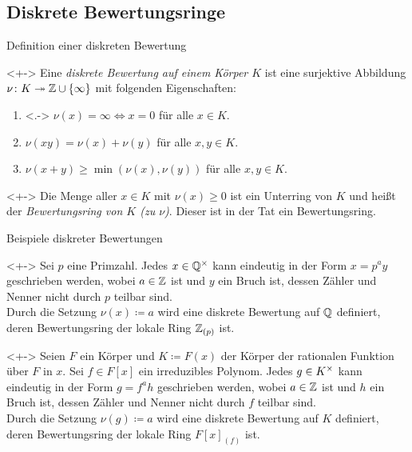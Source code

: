 \subsection{Diskrete Bewertungsringe}

\begin{frame}{Definition einer diskreten Bewertung}
	\begin{definition}<+->
		Eine \emph{diskrete Bewertung auf einem Körper \(K\)} ist eine surjektive Abbildung
		\(\nu\colon K \twoheadrightarrow \mathbb Z \cup \{\infty\}\) mit folgenden Eigenschaften:
		\begin{enumerate}[<+->]
		\item<.->
			\(\nu(x) = \infty \iff x = 0\) für alle \(x \in K\).
		\item
			\(\nu(xy) = \nu(x) + \nu(y)\) für alle \(x, y \in K\).
		\item
			\(\nu(x + y) \ge \min(\nu(x), \nu(y))\) für alle \(x, y \in K\).
		\end{enumerate}
	\end{definition}
	\begin{visibleenv}<+->
		Die Menge aller \(x \in K\) mit \(\nu(x) \ge 0\) ist ein Unterring von \(K\)
		und heißt der \emph{Bewertungsring von \(K\) (zu \(\nu\))}. Dieser ist in der Tat ein
		Bewertungsring.
	\end{visibleenv}
\end{frame}

\begin{frame}{Beispiele diskreter Bewertungen}
	\begin{example}<+->
		Sei \(p\) eine Primzahl. Jedes \(x \in \mathbb Q^\times\) kann eindeutig in der Form
		\(x = p^a y\) geschrieben werden, wobei \(a \in \mathbb Z\) ist und \(y\) ein Bruch ist,
		dessen Zähler und Nenner nicht durch \(p\) teilbar sind.
		\\
		Durch die Setzung \(\nu(x) \coloneqq a\) wird eine diskrete Bewertung auf \(\mathbb Q\) definiert,
		deren Bewertungsring der lokale Ring \(\mathbb Z_{(p)}\) ist.
	\end{example}
	\begin{example}<+->
		Seien \(F\) ein Körper und \(K \coloneqq F(x)\) der Körper der rationalen Funktion über \(F\) in \(x\).
		Sei \(f \in F[x]\) ein irreduzibles Polynom. Jedes \(g \in K^\times\) kann eindeutig in der
		Form \(g = f^a h\) geschrieben werden, wobei \(a \in \mathbb Z\) ist und \(h\) ein Bruch ist,
		dessen Zähler und Nenner nicht durch \(f\) teilbar sind.
		\\
		Durch die Setzung \(\nu(g) \coloneqq a\) wird eine diskrete Bewertung auf \(K\) definiert,
		deren Bewertungsring der lokale Ring \(F[x]_{(f)}\) ist.
	\end{example}
\end{frame}

